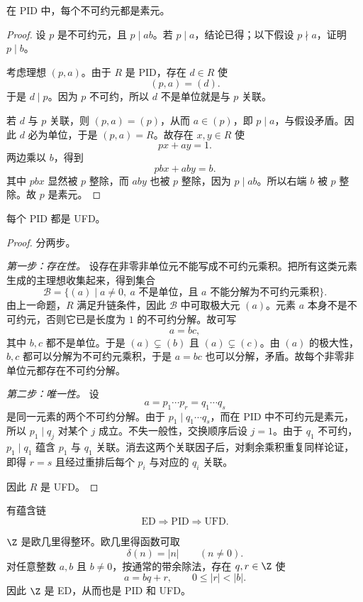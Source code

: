 \begin{lemma}
在 PID 中，每个不可约元都是素元。
\end{lemma}

\begin{proof}
设 $p$ 是不可约元，且 $p\mid ab$。若 $p\mid a$，结论已得；以下假设 $p\nmid a$，证明 $p\mid b$。

考虑理想 $(p,a)$。由于 $R$ 是 PID，存在 $d\in R$ 使
\[
(p,a)=(d).
\]
于是 $d\mid p$。因为 $p$ 不可约，所以 $d$ 不是单位就是与 $p$ 关联。

若 $d$ 与 $p$ 关联，则 $(p,a)=(p)$，从而 $a\in (p)$，即 $p\mid a$，与假设矛盾。因此 $d$ 必为单位，于是 $(p,a)=R$。故存在 $x,y\in R$ 使
\[
px+ay=1.
\]
两边乘以 $b$，得到
\[
pbx+aby=b.
\]
其中 $pbx$ 显然被 $p$ 整除，而 $aby$ 也被 $p$ 整除，因为 $p\mid ab$。所以右端 $b$ 被 $p$ 整除。故 $p$ 是素元。
\end{proof}

\begin{theorem}
每个 PID 都是 UFD。
\end{theorem}

\begin{proof}
分两步。

\emph{第一步：存在性。} 设存在非零非单位元不能写成不可约元乘积。把所有这类元素生成的主理想收集起来，得到集合
\[
\mathcal{B}=\{(a)\mid a\neq 0,\ a\text{ 不是单位，且 }a\text{ 不能分解为不可约元乘积}\}.
\]
由上一命题，$R$ 满足升链条件，因此 $\mathcal{B}$ 中可取极大元 $(a)$。元素 $a$ 本身不是不可约元，否则它已是长度为 $1$ 的不可约分解。故可写
\[
a=bc,
\]
其中 $b,c$ 都不是单位。于是 $(a)\subsetneq (b)$ 且 $(a)\subsetneq (c)$。由 $(a)$ 的极大性，$b,c$ 都可以分解为不可约元乘积，于是 $a=bc$ 也可以分解，矛盾。故每个非零非单位元都存在不可约分解。

\emph{第二步：唯一性。} 设
\[
a=p_1\cdots p_r=q_1\cdots q_s
\]
是同一元素的两个不可约分解。由于 $p_1\mid q_1\cdots q_s$，而在 PID 中不可约元是素元，所以 $p_1\mid q_j$ 对某个 $j$ 成立。不失一般性，交换顺序后设 $j=1$。由于 $q_1$ 不可约，$p_1\mid q_1$ 蕴含 $p_1$ 与 $q_1$ 关联。消去这两个关联因子后，对剩余乘积重复同样论证，即得 $r=s$ 且经过重排后每个 $p_i$ 与对应的 $q_i$ 关联。

因此 $R$ 是 UFD。
\end{proof}

\begin{corollary}
有蕴含链
\[
\text{ED} \Longrightarrow \text{PID} \Longrightarrow \text{UFD}.
\]
\end{corollary}

\begin{example}
$\Z$ 是欧几里得整环。欧几里得函数可取
\[
\delta(n)=|n|\qquad (n\neq 0).
\]
对任意整数 $a,b$ 且 $b\neq 0$，按通常的带余除法，存在 $q,r\in\Z$ 使
\[
a=bq+r,
\qquad 0\le |r|<|b|.
\]
因此 $\Z$ 是 ED，从而也是 PID 和 UFD。
\end{example}

